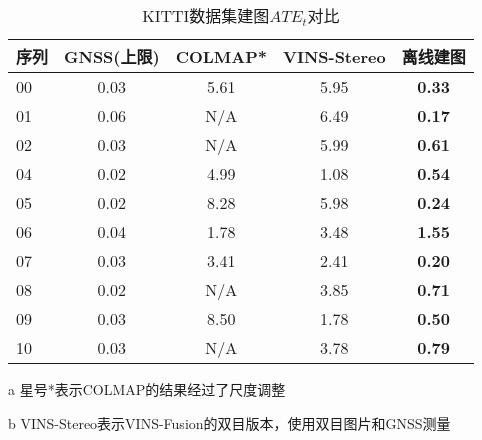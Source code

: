 \begin{table}
\centering
\begin{threeparttable}
\caption{KITTI数据集建图$ATE_t$\textdownarrow{}对比}
\setlength{\tabcolsep}{5mm}
\begin{tabular}{lcccc}
\toprule
序列 & GNSS(上限) & COLMAP*\cite{schonberger2016structure} & VINS-Stereo\cite{qin2019a} & 离线建图          \\ \midrule
00 & 0.03 & 5.61   & 5.95   & \cellcolor[HTML]{FFCCC9}\textbf{0.33} \\
01 & 0.06 & N/A    & 6.49   & \cellcolor[HTML]{FFCCC9}\textbf{0.17} \\
02 & 0.03 & N/A    & 5.99   & \cellcolor[HTML]{FFCCC9}\textbf{0.61} \\
04 & 0.02 & 4.99   & 1.08   & \cellcolor[HTML]{FFCCC9}\textbf{0.54} \\
05 & 0.02 & 8.28   & 5.98   & \cellcolor[HTML]{FFCCC9}\textbf{0.24} \\
06 & 0.04 & 1.78   & 3.48   & \cellcolor[HTML]{FFCCC9}\textbf{1.55} \\
07 & 0.03 & 3.41   & 2.41   & \cellcolor[HTML]{FFCCC9}\textbf{0.20} \\
08 & 0.02 & N/A    & 3.85   & \cellcolor[HTML]{FFCCC9}\textbf{0.71} \\
09 & 0.03 & 8.50   & 1.78   & \cellcolor[HTML]{FFCCC9}\textbf{0.50} \\
10 & 0.03 & N/A    & 3.78   & \cellcolor[HTML]{FFCCC9}\textbf{0.79} \\ \bottomrule
\end{tabular}
\label{tab:map_ate}
\begin{tablenotes}
  \item [a] 星号*表示COLMAP的结果经过了尺度调整
  \item [b] VINS-Stereo表示VINS-Fusion的双目版本，使用双目图片和GNSS测量
\end{tablenotes}
\end{threeparttable}
\end{table}

